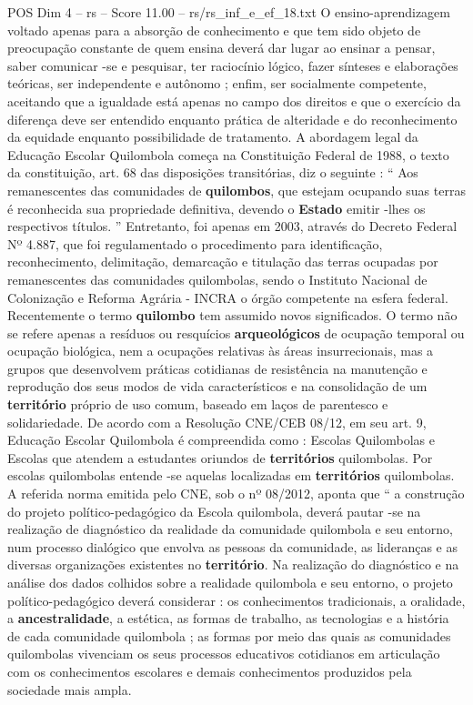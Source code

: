 \begin{textsample}{POS Dim 4 – rs – Score 11.00 – rs/rs\_inf\_e\_ef\_18.txt}
O ensino-aprendizagem voltado apenas para a absorção de conhecimento e que tem sido objeto de preocupação constante de quem ensina deverá dar lugar ao ensinar a pensar, saber comunicar -se e pesquisar, ter raciocínio lógico, fazer sínteses e elaborações teóricas, ser independente e autônomo ; enfim, ser socialmente competente, aceitando que a igualdade está apenas no campo dos direitos e que o exercício da diferença deve ser entendido enquanto prática de alteridade e do reconhecimento da equidade enquanto possibilidade de tratamento.
A abordagem legal da Educação Escolar Quilombola começa na Constituição Federal de 1988, o texto da constituição, art. 68 das disposições transitórias, diz o seguinte : “ Aos remanescentes das comunidades de \textbf{quilombos}, que estejam ocupando suas terras é reconhecida sua propriedade definitiva, devendo o \textbf{Estado} emitir -lhes os respectivos títulos. ” Entretanto, foi apenas em 2003, através do Decreto Federal Nº 4.887, que foi regulamentado o procedimento para identificação, reconhecimento, delimitação, demarcação e titulação das terras ocupadas por remanescentes das comunidades quilombolas, sendo o Instituto Nacional de Colonização e Reforma Agrária - INCRA o órgão competente na esfera federal.
Recentemente o termo \textbf{quilombo} tem assumido novos significados.
O termo não se refere apenas a resíduos ou resquícios \textbf{arqueológicos} de ocupação temporal ou ocupação biológica, nem a ocupações relativas às áreas insurrecionais, mas a grupos que desenvolvem práticas cotidianas de resistência na manutenção e reprodução dos seus modos de vida característicos e na consolidação de um \textbf{território} próprio de uso comum, baseado em laços de parentesco e solidariedade.
De acordo com a Resolução CNE/CEB 08/12, em seu art. 9, Educação Escolar Quilombola é compreendida como : Escolas Quilombolas e Escolas que atendem a estudantes oriundos de \textbf{territórios} quilombolas.
Por escolas quilombolas entende -se aquelas localizadas em \textbf{territórios} quilombolas.
A referida norma emitida pelo CNE, sob o nº 08/2012, aponta que “ a construção do projeto político-pedagógico da Escola quilombola, deverá pautar -se na realização de diagnóstico da realidade da comunidade quilombola e seu entorno, num processo dialógico que envolva as pessoas da comunidade, as lideranças e as diversas organizações existentes no \textbf{território}.
Na realização do diagnóstico e na análise dos dados colhidos sobre a realidade quilombola e seu entorno, o projeto político-pedagógico deverá considerar : os conhecimentos tradicionais, a oralidade, a \textbf{ancestralidade}, a estética, as formas de trabalho, as tecnologias e a história de cada comunidade quilombola ; as formas por meio das quais as comunidades quilombolas vivenciam os seus processos educativos cotidianos em articulação com os conhecimentos escolares e demais conhecimentos produzidos pela sociedade mais ampla.

\end{textsample}
